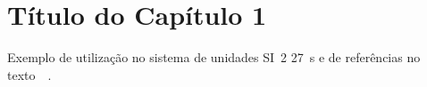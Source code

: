 \chapter{Título do Capítulo 1}
\label{Ch:EstadoDaArte}
Exemplo de utilização no sistema de unidades SI~\SI{2}{\min} \SI{27}{\second} e de referências no texto~\citep{Rules}~\citep{AllJapan}.

 








